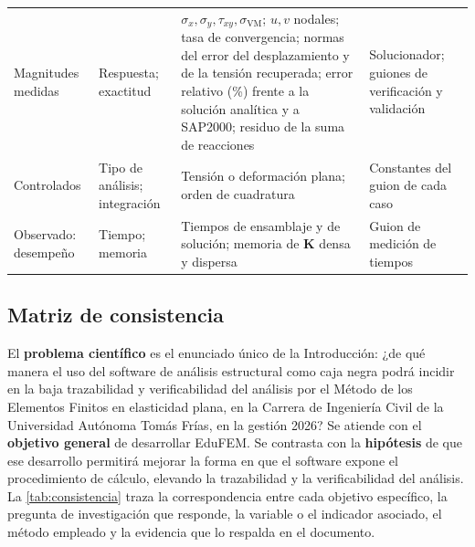 {\begin{longtable}{@{}>{\raggedright\arraybackslash}p{2.9cm}>{\raggedright\arraybackslash}p{2.5cm}>{\raggedright\arraybackslash}p{5.5cm}>{\raggedright\arraybackslash}p{2.7cm}@{}}
Magnitudes medidas & Respuesta; exactitud & $\sigma_x,\sigma_y,\tau_{xy},\sigma_{\mathrm{VM}}$; $u,v$ nodales; tasa de convergencia; normas del error del desplazamiento y de la tensión recuperada; error relativo (\%) frente a la solución analítica y a SAP2000; residuo de la suma de reacciones & Solucionador; guiones de verificación y validación \\
Controlados & Tipo de análisis; integración & Tensión o deformación plana; orden de cuadratura & Constantes del guion de cada caso \\
Observado: desempeño & Tiempo; memoria & Tiempos de ensamblaje y de solución; memoria de $\bm{K}$ densa y dispersa & Guion de medición de tiempos \\
\end{longtable}}

\subsection{Matriz de consistencia}
\label{sec:matriz-consistencia}

El \textbf{problema científico} es el enunciado único de la Introducción: ¿de qué manera el uso del software de análisis estructural como caja negra podrá incidir en la baja trazabilidad y verificabilidad del análisis por el Método de los Elementos Finitos en elasticidad plana, en la Carrera de Ingeniería Civil de la Universidad Autónoma Tomás Frías, en la gestión 2026? Se atiende con el \textbf{objetivo general} de desarrollar EduFEM. Se contrasta con la \textbf{hipótesis} de que ese desarrollo permitirá mejorar la forma en que el software expone el procedimiento de cálculo, elevando la trazabilidad y la verificabilidad del análisis. La \autoref{tab:consistencia} traza la correspondencia entre cada objetivo específico, la pregunta de investigación que responde, la variable o el indicador asociado, el método empleado y la evidencia que lo respalda en el documento.


